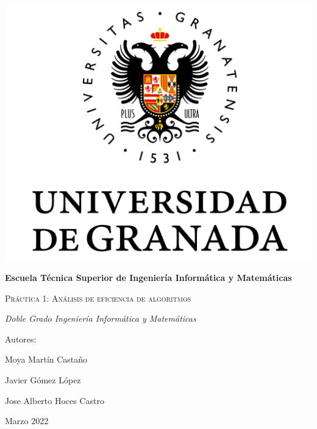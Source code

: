 \documentclass[10pt,a4paper]{article}
\begin{document}
\begin{titlepage}
	\centering
	{\includegraphics[scale=0.5]{Logo_UGR.png}\par}
	\vspace{1cm}
	{\bfseries\Large Escuela T\'ecnica Superior de Ingeniería Informática y Matem\'aticas \par}
	\vspace{2.5cm}
	{\scshape\Huge Pr\'actica 1: An\'alisis de eficiencia de algoritmos \par}
	\vspace{3cm}
	{\itshape\Large Doble Grado Ingeniería Informática y Matemáticas}
	\vfill
	{\Large Autores: \par}
	{\Large Moya Mart\'in Castaño \par}
	{\Large Javier Gómez López \par}
	{\Large Jose Alberto Hoces Castro\par}
	\vfill
	{\Large Marzo 2022 \par}
\end{titlepage}

\thispagestyle{empty}
\null
\vfill
\end{document}
